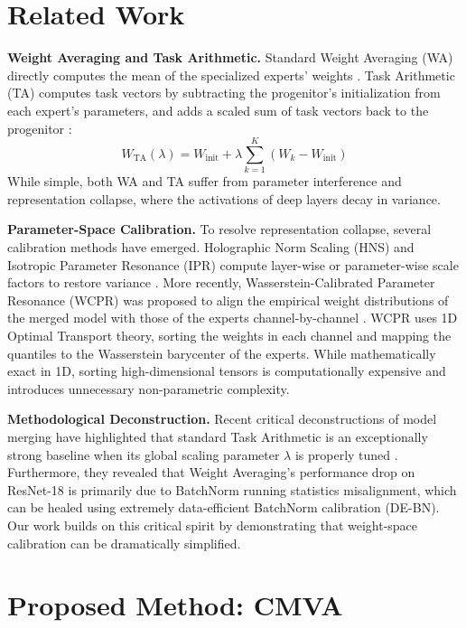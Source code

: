 \documentclass{article}
\theoremstyle{plain}
\theoremstyle{definition}
\theoremstyle{remark}
\begin{document}
\section{Related Work}
\label{sec:related}

\textbf{Weight Averaging and Task Arithmetic.} Standard Weight Averaging (WA) directly computes the mean of the specialized experts' weights \citep{wortsman2022model}. Task Arithmetic (TA) computes task vectors by subtracting the progenitor's initialization from each expert's parameters, and adds a scaled sum of task vectors back to the progenitor \citep{ilharco2022editing}:
\begin{equation}
  W_{\text{TA}}(\lambda) = W_{\text{init}} + \lambda \sum_{k=1}^K (W_k - W_{\text{init}})
\end{equation}
While simple, both WA and TA suffer from parameter interference and representation collapse, where the activations of deep layers decay in variance.

\textbf{Parameter-Space Calibration.} To resolve representation collapse, several calibration methods have emerged. Holographic Norm Scaling (HNS) and Isotropic Parameter Resonance (IPR) compute layer-wise or parameter-wise scale factors to restore variance \citep{submission5}. More recently, Wasserstein-Calibrated Parameter Resonance (WCPR) was proposed to align the empirical weight distributions of the merged model with those of the experts channel-by-channel \citep{submission9}. WCPR uses 1D Optimal Transport theory, sorting the weights in each channel and mapping the quantiles to the Wasserstein barycenter of the experts. While mathematically exact in 1D, sorting high-dimensional tensors is computationally expensive and introduces unnecessary non-parametric complexity.

\textbf{Methodological Deconstruction.} Recent critical deconstructions of model merging have highlighted that standard Task Arithmetic is an exceptionally strong baseline when its global scaling parameter $\lambda$ is properly tuned \citep{submission10}. Furthermore, they revealed that Weight Averaging's performance drop on ResNet-18 is primarily due to BatchNorm running statistics misalignment, which can be healed using extremely data-efficient BatchNorm calibration (DE-BN). Our work builds on this critical spirit by demonstrating that weight-space calibration can be dramatically simplified.

\section{Proposed Method: CMVA}
\label{sec:method}
\end{document}
